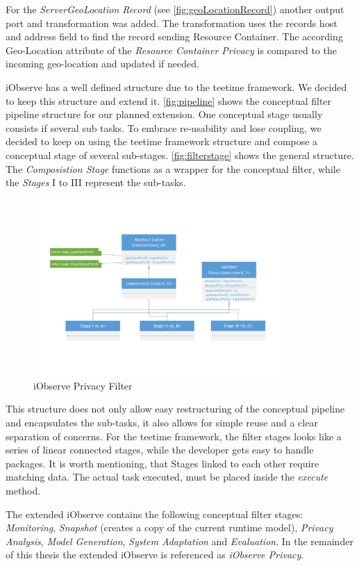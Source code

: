 For the \textit{ServerGeoLocation Record} (see \autoref{fig:geoLocationRecord}) another output port and transformation was added. The transformation uses the records host and address field to find the record sending Resource Container. The according Geo-Location attribute of the \textit{Resource Container Privacy} is compared to the incoming geo-location and updated if needed.

iObserve has a well defined structure due to the teetime framework. We decided to keep this structure and extend it. \autoref{fig:pipeline} shows the conceptual filter pipeline structure for our planned extension. One conceptual stage usually consists if several sub tasks. To embrace re-usability and lose coupling, we decided to keep on using the teetime framework structure and compose a conceptual stage of several sub-stages. \autoref{fig:filterstage} shows the general structure. The \textit{Composistion Stage} functions as a wrapper for the conceptual filter, while the \textit{Stages} I to III represent the sub-tasks.

\begin{figure}[h]
	\centering
	\includegraphics[trim = 20mm 40mm 20mm 35mm, clip, width=0.85\textwidth]{graphs/StageComposition}
	\caption{iObserve Privacy Filter}
	\label{fig:filterstage}
\end{figure}

This structure does not only allow easy restructuring of the conceptual pipeline and encapsulates the sub-tasks, it also allows for simple reuse and a clear separation of concerns. 
For the teetime framework, the filter stages looks like a series of linear connected stages, while the developer gets easy to handle packages. It is worth mentioning, that Stages linked to each other require matching data. The actual task executed, must be placed inside the \textit{execute} method.

The extended iObserve contains the following conceptual filter stages: \textit{Monitoring}, \textit{Snapshot} (creates a copy of the current runtime model), \textit{Privacy Analysis}, \textit{Model Generation}, \textit{System Adaptation} and \textit{Evaluation}. In the remainder of this thesis the extended iObserve is referenced as \textit{iObserve Privacy}.



